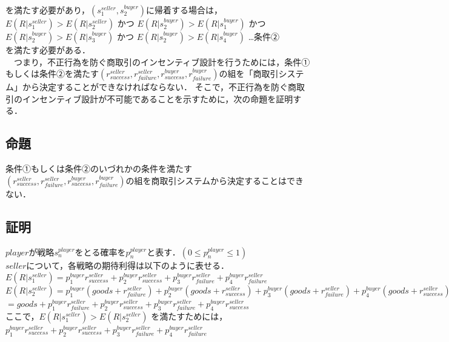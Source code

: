 \documentclass[twocolumn, a4j]{article}
\begin{document}
を満たす必要があり，$(s^{seller}_1, s^{buyer}_2)$に帰着する場合は，\\

$E(R|s^{seller}_1)>E(R|s^{seller}_2)$
かつ
$E(R|s^{buyer}_2)>E(R|s^{buyer}_1)$
かつ
$E(R|s^{buyer}_2) > E(R|s^{buyer}_3)$
かつ
$E(R|s^{buyer}_2) > E(R|s^{buyer}_4)$ …条件②\\

を満たす必要がある．\\

　つまり，不正行為を防ぐ商取引のインセンティブ設計を行うためには，条件①もしくは条件②を満たす$(r^{seller}_{success}, r^{seller}_{failure}, r^{buyer}_{success}, r^{buyer}_{failure})$の組を「商取引システム」から決定することができなければならない．
そこで，不正行為を防ぐ商取引のインセンティブ設計が不可能であることを示すために，次の命題を証明する．

\subsection{命題}
条件①もしくは条件②のいづれかの条件を満たす$(r^{seller}_{success}, r^{seller}_{failure}, r^{buyer}_{success}, r^{buyer}_{failure})$の組を商取引システムから決定することはできない．

\subsection{証明}
$player$が戦略$s^{player}_n$をとる確率を$p^{player}_{n}$と表す．$(0 \leq p^{player}_{n} \leq 1)$\\

$seller$について，各戦略の期待利得は以下のように表せる．　\\
$E(R|s^{seller}_1)=p^{buyer}_1{r}^{seller}_{success}+p^{buyer}_2r^{seller}_{suceess}+p^{buyer}_3r^{seller}_{failure}+p^{buyer}_4r^{seller}_{failure}$ \\

$ E(R |s^{seller}_2) = p^{buyer}_1 (goods + r^{seller}_{failure}) + p^{buyer}_2 (goods + r^{seller}_{success}) + p^{buyer}_3 (goods + r^{seller}_{failure} ) + p^{buyer}_4 (goods + r^{seller}_{success})$ \\

$ = goods + p^{buyer}_1 r^{seller}_{failure} + p^{buyer}_2 r^{seller}_{success} + p^{buyer}_3 r^{seller}_{failure} + p^{buyer}_4 r^{seller}_{success}$ \\

ここで，$E(R |s^{seller}_1) > E(R |s^{seller}_2)$ を満たすためには， \\
$p^{buyer}_1 {r}^{seller}_{success} + p^{buyer}_2 r^{seller}_{suceess} + p^{buyer}_3 r^{seller}_{failure} + p^{buyer}_4 r^{seller}_{failure}$ \\
\end{document}
